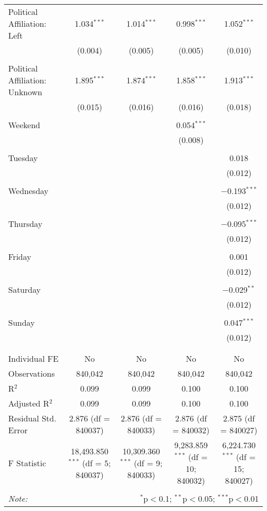 \documentclass[
]{article}
\begin{document}
\begin{table}[!htbp]
{\begin{tabular}{@{\extracolsep{5pt}}lcccc}
 Political Affiliation: Left & 1.034$^{***}$ & 1.014$^{***}$ & 0.998$^{***}$ & 1.052$^{***}$ \\ 
  & (0.004) & (0.005) & (0.005) & (0.010) \\ 
  & & & & \\ 
 Political Affiliation: Unknown & 1.895$^{***}$ & 1.874$^{***}$ & 1.858$^{***}$ & 1.913$^{***}$ \\ 
  & (0.015) & (0.016) & (0.016) & (0.018) \\ 
  & & & & \\ 
 Weekend &  &  & 0.054$^{***}$ &  \\ 
  &  &  & (0.008) &  \\ 
  & & & & \\ 
 Tuesday &  &  &  & 0.018 \\ 
  &  &  &  & (0.012) \\ 
  & & & & \\ 
 Wednesday &  &  &  & $-$0.193$^{***}$ \\ 
  &  &  &  & (0.012) \\ 
  & & & & \\ 
 Thursday &  &  &  & $-$0.095$^{***}$ \\ 
  &  &  &  & (0.012) \\ 
  & & & & \\ 
 Friday &  &  &  & 0.001 \\ 
  &  &  &  & (0.012) \\ 
  & & & & \\ 
 Saturday &  &  &  & $-$0.029$^{**}$ \\ 
  &  &  &  & (0.012) \\ 
  & & & & \\ 
 Sunday &  &  &  & 0.047$^{***}$ \\ 
  &  &  &  & (0.012) \\ 
  & & & & \\ 
\hline \\[-1.8ex] 
Individual FE & No & No & No & No \\ 
Observations & 840,042 & 840,042 & 840,042 & 840,042 \\ 
R$^{2}$ & 0.099 & 0.099 & 0.100 & 0.100 \\ 
Adjusted R$^{2}$ & 0.099 & 0.099 & 0.100 & 0.100 \\ 
Residual Std. Error & 2.876 (df = 840037) & 2.876 (df = 840033) & 2.876 (df = 840032) & 2.875 (df = 840027) \\ 
F Statistic & 18,493.850$^{***}$ (df = 5; 840037) & 10,309.360$^{***}$ (df = 9; 840033) & 9,283.859$^{***}$ (df = 10; 840032) & 6,224.730$^{***}$ (df = 15; 840027) \\ 
\hline 
\hline \\[-1.8ex] 
\textit{Note:}  & \multicolumn{4}{r}{$^{*}$p$<$0.1; $^{**}$p$<$0.05; $^{***}$p$<$0.01} \\ 
\end{tabular}
} 
\end{table} 
\newpage
\end{document}
